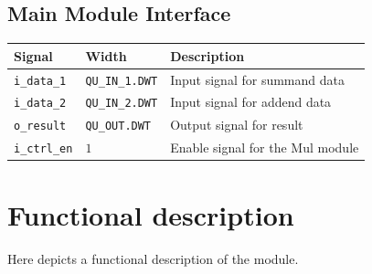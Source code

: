 \documentclass[a4paper, oneside]{report}
\begin{document}
            \subsection{Main Module Interface}
                \begin{longtable}{lll}
                    \toprule
                    \textbf{Signal}      & \textbf{Width}    & \textbf{Description} \\
                    \midrule
                    \texttt{i\_data\_1}      & \texttt{QU\_IN\_1.DWT}         & Input signal for summand data \\
                    \texttt{i\_data\_2}      & \texttt{QU\_IN\_2.DWT}        & Input signal for addend data \\
                    \texttt{o\_result}    & \texttt{QU\_OUT.DWT}         & Output signal for result \\
                    \texttt{i\_ctrl\_en}     & $1$                 & Enable signal for the Mul module\\
                    \bottomrule
                \end{longtable}
        
        \section{Functional description}
        Here depicts a functional description of the module.
\end{document}
